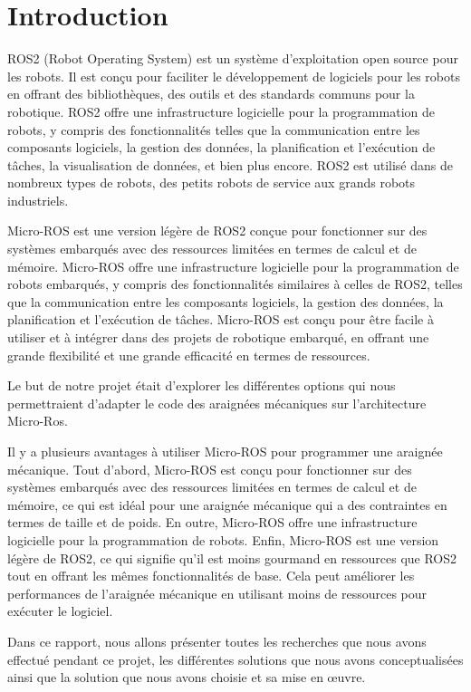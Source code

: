 	\chapter{Introduction}

ROS2 (Robot Operating System) est un système d'exploitation open source pour les robots. 
Il est conçu pour faciliter le développement de logiciels pour les robots en offrant des bibliothèques, 
des outils et des standards communs pour la robotique. ROS2 offre une infrastructure logicielle pour la programmation de robots, 
y compris des fonctionnalités telles que la communication entre les composants logiciels, la gestion des données, 
la planification et l'exécution de tâches, la visualisation de données, et bien plus encore. 
ROS2 est utilisé dans de nombreux types de robots, des petits robots de service aux grands robots industriels. 
\linebreak

Micro-ROS est une version légère de ROS2 conçue pour fonctionner sur des systèmes embarqués avec 
des ressources limitées en termes de calcul et de mémoire. Micro-ROS offre une infrastructure logicielle pour la programmation 
de robots embarqués, y compris des fonctionnalités similaires à celles de ROS2, telles que la communication entre les composants 
logiciels, la gestion des données, la planification et l'exécution de tâches. 
Micro-ROS est conçu pour être facile à utiliser et à intégrer dans des projets de robotique embarqué, en offrant une grande 
flexibilité et une grande efficacité en termes de ressources. 
\linebreak

Le but de notre projet était d’explorer les différentes options qui nous permettraient d’adapter le code des araignées 
mécaniques sur l’architecture Micro-Ros. 
\linebreak

Il y a plusieurs avantages à utiliser Micro-ROS pour programmer une araignée mécanique. 
Tout d'abord, Micro-ROS est conçu pour fonctionner sur des systèmes embarqués avec des ressources limitées en termes 
de calcul et de mémoire, ce qui est idéal pour une araignée mécanique qui a des contraintes en termes de taille et de poids. 
En outre, Micro-ROS offre une infrastructure logicielle pour la programmation de robots. 
Enfin, Micro-ROS est une version légère de ROS2, ce qui signifie qu'il est moins gourmand en ressources que ROS2 tout en offrant 
les mêmes fonctionnalités de base. Cela peut améliorer les performances de l'araignée mécanique en utilisant moins de ressources 
pour exécuter le logiciel. 
\linebreak

Dans ce rapport, nous allons présenter toutes les recherches que nous avons effectué pendant ce projet, les différentes 
solutions que nous avons conceptualisées ainsi que la solution que nous avons choisie et sa mise en œuvre. 
\linebreak
